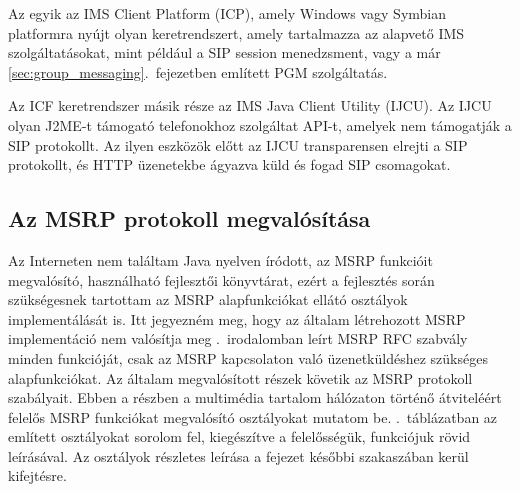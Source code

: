 Az egyik az IMS Client Platform (ICP), amely Windows vagy Symbian platformra nyújt olyan keretrendszert, amely tartalmazza az alapvető IMS szolgáltatásokat, mint például a SIP session menedzsment, vagy a már \ref{sec:group_messaging}.~fejezetben említett PGM szolgáltatás.

Az ICF keretrendszer másik része az IMS Java Client Utility (IJCU). Az IJCU olyan J2ME-t támogató telefonokhoz szolgáltat API-t, amelyek nem támogatják a SIP protokollt. Az ilyen eszközök előtt az IJCU transparensen elrejti a SIP protokollt, és HTTP üzenetekbe ágyazva küld és fogad SIP csomagokat.

\subsection{Az MSRP protokoll megvalósítása}
\label{sec:msrp_implementacio}

Az Interneten nem találtam Java nyelven íródott, az MSRP funkcióit megvalósító, használható fejlesztői könyvtárat, ezért a fejlesztés során szükségesnek tartottam az MSRP alapfunkciókat ellátó osztályok implementálását is. Itt jegyezném meg, hogy az általam létrehozott MSRP implementáció nem valósítja meg .~irodalomban leírt MSRP RFC szabvály minden funkcióját, csak az MSRP kapcsolaton való üzenetküldéshez szükséges alapfunkciókat. Az általam megvalósított részek követik az MSRP protokoll szabályait\cite{rfc4975}. Ebben a részben a multimédia tartalom hálózaton történő átviteléért felelős MSRP funkciókat megvalósító osztályokat mutatom be.  .~táblázatban az említett osztályokat sorolom fel, kiegészítve a felelősségük, funkciójuk rövid leírásával. Az osztályok részletes leírása a fejezet későbbi szakaszában kerül kifejtésre.

